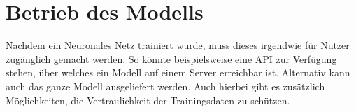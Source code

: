 \section{Betrieb des Modells}\label{sec:betrieb}

Nachdem ein Neuronales Netz trainiert wurde, muss dieses irgendwie für Nutzer zugänglich gemacht werden.
So könnte beispielsweise eine API zur Verfügung stehen, über welches ein Modell auf einem Server erreichbar ist.
Alternativ kann auch das ganze Modell ausgeliefert werden.
Auch hierbei gibt es zusätzlich Möglichkeiten, die Vertraulichkeit der Trainingsdaten zu schützen.







